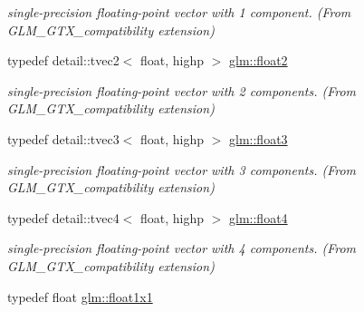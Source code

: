 \begin{DoxyCompactItemize}
\begin{DoxyCompactList}\small\item\em single-\/precision floating-\/point vector with 1 component. (From G\+L\+M\+\_\+\+G\+T\+X\+\_\+compatibility extension) \end{DoxyCompactList}\item 
typedef detail\+::tvec2$<$ float, highp $>$ \hyperlink{group__gtx__compatibility_ga6ab0b791bbb15ef51a0e930a8710e6b1}{glm\+::float2}\hypertarget{group__gtx__compatibility_ga6ab0b791bbb15ef51a0e930a8710e6b1}{}\label{group__gtx__compatibility_ga6ab0b791bbb15ef51a0e930a8710e6b1}

\begin{DoxyCompactList}\small\item\em single-\/precision floating-\/point vector with 2 components. (From G\+L\+M\+\_\+\+G\+T\+X\+\_\+compatibility extension) \end{DoxyCompactList}\item 
typedef detail\+::tvec3$<$ float, highp $>$ \hyperlink{group__gtx__compatibility_ga7e0d8fa3501c0a7eaaca31adb6e02de2}{glm\+::float3}\hypertarget{group__gtx__compatibility_ga7e0d8fa3501c0a7eaaca31adb6e02de2}{}\label{group__gtx__compatibility_ga7e0d8fa3501c0a7eaaca31adb6e02de2}

\begin{DoxyCompactList}\small\item\em single-\/precision floating-\/point vector with 3 components. (From G\+L\+M\+\_\+\+G\+T\+X\+\_\+compatibility extension) \end{DoxyCompactList}\item 
typedef detail\+::tvec4$<$ float, highp $>$ \hyperlink{group__gtx__compatibility_gac0676d140051809309ca683c325bf439}{glm\+::float4}\hypertarget{group__gtx__compatibility_gac0676d140051809309ca683c325bf439}{}\label{group__gtx__compatibility_gac0676d140051809309ca683c325bf439}

\begin{DoxyCompactList}\small\item\em single-\/precision floating-\/point vector with 4 components. (From G\+L\+M\+\_\+\+G\+T\+X\+\_\+compatibility extension) \end{DoxyCompactList}\item 
typedef float \hyperlink{group__gtx__compatibility_gaac1faa940ac1fbb32d4a315005b578af}{glm\+::float1x1}\hypertarget{group__gtx__compatibility_gaac1faa940ac1fbb32d4a315005b578af}{}\label{group__gtx__compatibility_gaac1faa940ac1fbb32d4a315005b578af}


\end{DoxyCompactItemize}
